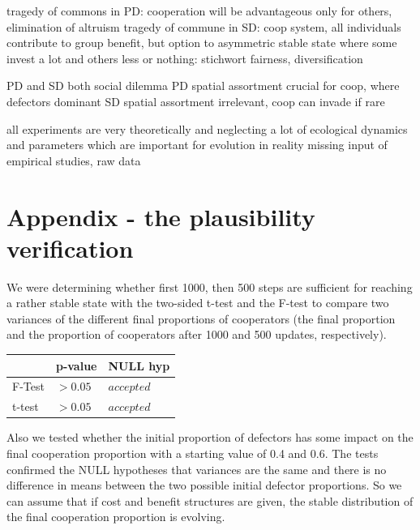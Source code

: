 \documentclass[DIV=calc, paper=a4, fontsize=11pt, twocolumn]{scrartcl}	 %
\begin{document}
tragedy of commons in PD: cooperation will be advantageous only for others, elimination of altruism 
tragedy of commune in SD: coop system, all individuals contribute to group benefit, but option to asymmetric stable state where some invest a lot and others less or nothing: stichwort fairness, diversification

PD and SD both social dilemma
PD spatial assortment crucial for coop, where defectors dominant
SD spatial assortment irrelevant, coop can invade if rare

all experiments are very theoretically and neglecting a lot of ecological dynamics and parameters which are important for evolution in reality
missing input of empirical studies, raw data


\section*{Appendix - the plausibility verification}
\label{sec:appendix}
\noindent We were determining whether first 1000, then 500 steps are sufficient for reaching a rather stable state with the two-sided t-test and the F-test to compare two variances of the different final proportions of cooperators (the final proportion and the proportion of cooperators after 1000 and 500 updates, respectively). \\

\begin{tabular}{l|ll}
\centering
  & p-value & NULL hyp \\
\midrule
F-Test & $>0.05$ & $accepted$ \\
t-test & $>0.05$ & $accepted$ \\
\end{tabular}

\noindent Also we tested whether the initial proportion of defectors has some impact on the final cooperation proportion with a starting value of 0.4 and 0.6. The tests confirmed the NULL hypotheses that variances are the same and there is no difference in means between the two possible initial defector proportions. So we can assume that if cost and benefit structures are given, the stable distribution of the final cooperation proportion is evolving. 


\nocite{Albizu2013}



\end{document}
